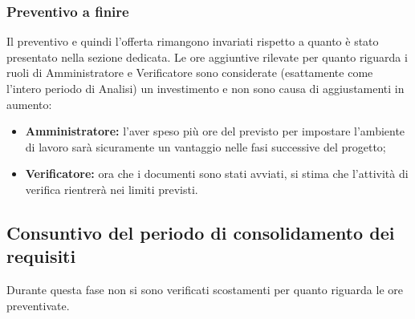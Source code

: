 \subsubsection{Preventivo a finire}
Il preventivo e quindi l'offerta rimangono invariati rispetto a quanto è stato presentato nella sezione dedicata. Le ore aggiuntive rilevate per quanto riguarda i ruoli di Amministratore e Verificatore sono considerate (esattamente come l'intero periodo di Analisi) un investimento e non sono causa di aggiustamenti in aumento: 
\begin{itemize}
    \item \textbf{Amministratore:} l'aver speso più ore del previsto per impostare l'ambiente di lavoro sarà sicuramente un vantaggio nelle fasi successive del progetto;
    \item \textbf{Verificatore:} ora che i documenti sono stati avviati, si stima che l'attività di verifica rientrerà nei limiti previsti.
\end{itemize}

\subsection{Consuntivo del periodo di consolidamento dei requisiti}
Durante questa fase non si sono verificati scostamenti per quanto riguarda le ore preventivate. 

